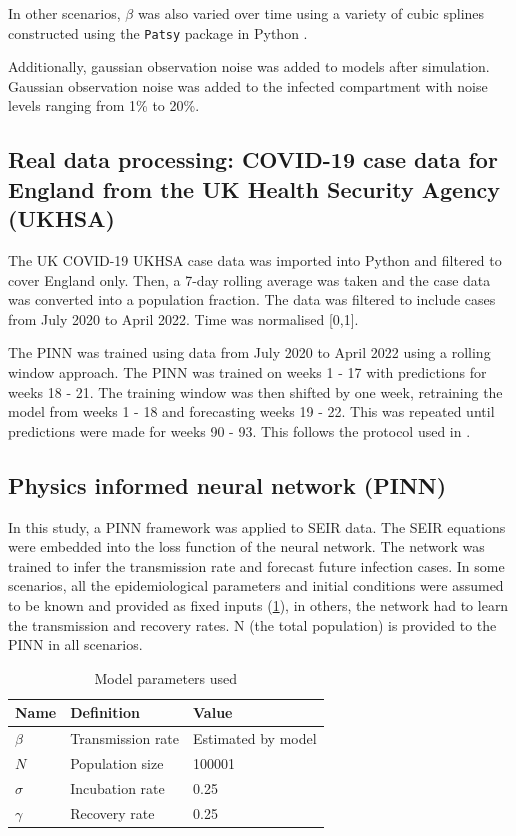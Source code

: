 \documentclass{article}
\begin{document}
 In other scenarios, $\beta$ was also varied over time using a variety of cubic splines constructed using the \texttt{Patsy} package in Python \parencite{Hastie2009-iz}.

Additionally, gaussian observation noise was added to models after simulation. Gaussian observation noise was added to the infected compartment with noise levels ranging from 1\% to 20\%.

\subsection{Real data processing: COVID-19 case data for England from the UK Health Security Agency (UKHSA)}
The UK COVID-19 UKHSA case data was imported into Python and filtered to cover England only. Then, a 7-day rolling average was taken and the case data was converted into a population fraction. The data was filtered to include cases from July 2020 to April 2022. Time was normalised [0,1]. 

The PINN was trained using data from July 2020 to April 2022 using a rolling window approach. The PINN was trained on weeks 1 - 17 with predictions for weeks 18 - 21. The training window was then shifted by one week, retraining the model from weeks 1 - 18 and forecasting weeks 19 - 22. This was repeated until predictions were made for weeks 90 - 93. This follows the protocol used in \parencite{Qian2025}.

\subsection{Physics informed neural network (PINN)}
In this study, a PINN framework was applied to SEIR data. The SEIR equations were embedded into the loss function of the neural network. The network was trained to infer the transmission rate and forecast future infection cases. In some scenarios, all the epidemiological parameters and initial conditions were assumed to be known and provided as fixed inputs (\cref{tab:model_parameters}), in others, the network had to learn the transmission and recovery rates. N (the total population) is provided to the PINN in all scenarios.


\begin{table}[h]
    \centering
    \caption{Model parameters used}
    \label{tab:model_parameters}
    
    \begin{tabular}{lll}
        \hline
        Name & Definition & Value \\
        \hline
        $\beta$  & Transmission rate & Estimated by model \\
        $N$      & Population size   & 100001 \\
        $\sigma$ & Incubation rate   & 0.25 \\
        $\gamma$ & Recovery rate     & 0.25 \\
        \hline
    \end{tabular}
\end{table}
\end{document}
